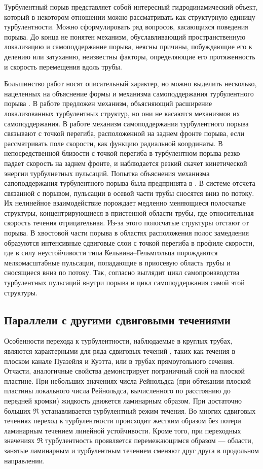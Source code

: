 Турбулентный порыв представляет собой интересный гидродинамический объект, который в некотором отношении можно рассматривать как структурную единицу турбулентности. Можно сформулировать ряд вопросов, касающихся поведения порыва. До конца не понятен механизм, обуславливающий пространственную локализацию и самоподдержание порыва, неясны причины, побуждающие его к делению или затуханию, неизвестны факторы, определяющие его протяженность и скорость перемещения вдоль трубы.

Большинство работ носят описательный характер, но можно выделить несколько, нацеленных на объяснение формы и механизма самоподдержания турбулентного порыва \cite{Duguet2010, Hof2010, Shimizu2009}. В работе \cite{Duguet2010} предложен механизм, объясняющий расширение локализованных турбулентных структур, но они не касаются механизмов их самоподдержания. В работе \cite{Hof2010} механизм самоподдержания турбулентного порыва связывают с точкой перегиба, расположенной на заднем фронте порыва, если рассматривать поле скорости, как функцию радиальной координаты. В непосредственной близости с точкой перегиба в турбулентном порыва резко падает скорость на заднем фронте, и наблюдается резкий скачет кинетической энергии турбулнетных пульсаций. 
Попытка объяснения механизма сапоподдержания турбулентного порыва была предпринята в \cite{Shimizu2009}. В системе отсчета связанной с порывом, пульсации в осевой части трубы сносятся вниз по потоку. Их нелинейное взаимодействие порождает медленно меняющиеся полосчатые структуры, концентрирующиеся в пристенной области трубы, где относительная скорость течения отрицательная. Из-за этого полосчатые структуры отстают от порыва. В хвостовой части порыва в областях расположения полос замедления образуются интенсивные сдвиговые слои с точкой перегиба в профиле скорости, где в силу неустойчивости типа Кельвина--Гельмгольца порождаются мелкомасштабные пульсации, попадающие в приосевую область трубы и сносящиеся вниз по потоку. Так, согласно \cite{Shimizu2009} выглядит цикл самопроизводства турбулентных пульсаций внутри порыва и цикл самоподдержания самой этой структуры.


	\subsection{Параллели с другими сдвиговыми течениями}

Особенности перехода к турбулентности, наблюдаемые в круглых трубах, являются характерными для ряда сдвиговых течений \cite{Manneville2015, Manneville2016}, таких как течения в плоском канале Пуазейля и Куэтта, или в трубах прямоугольного сечения. Отчасти, аналогичные свойства демонстрирует пограничный слой на плоской пластине. При небольших значениях числа Рейнольдса (при обтекании плоской пластины локального числа Рейнольдса, вычисленного по расстоянию до передней кромки) жидкость движется ламинарным образом. При достаточно больших $\Re$ устанавливается турбулентный режим течения. Во многих сдвиговых течениях переход к турбулентности происходит жестким образом без потери ламинарным течением линейной устойчивости. Кроме того, при переходных значениях $\Re$ турбулентность проявляется перемежающимся образом --- области, занятые ламинарным и турбулентным течением сменяют друг друга в продольном направлении. 

